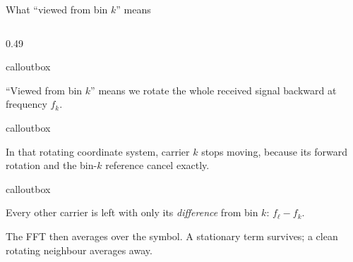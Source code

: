 \documentclass[aspectratio=169,10pt]{beamer}
\newenvironment{callout}{%
  \begin{beamercolorbox}[wd=\linewidth,sep=4pt,rounded=true]{calloutbox}\scriptsize%
}{%
  \end{beamercolorbox}%
}
\begin{document}
\begin{frame}{What ``viewed from bin $k$'' means}
\begin{columns}[T,onlytextwidth]
    \begin{column}{0.49\textwidth}
      \vspace{-0.05cm}
      \begin{callout}
        ``Viewed from bin $k$'' means we rotate the whole received signal backward at frequency $f_k$.
      \end{callout}
      \vspace{0.10cm}
      \begin{callout}
        In that rotating coordinate system, carrier $k$ stops moving, because its forward rotation and the bin-$k$ reference cancel exactly.
      \end{callout}
      \vspace{0.10cm}
      \begin{callout}
        Every other carrier is left with only its \emph{difference} from bin $k$: $f_\ell-f_k$.
      \end{callout}
      \vspace{0.14cm}
      {\scriptsize\color{muted}
      The FFT then averages over the symbol. A stationary term survives; a clean rotating neighbour averages away.}
    \end{column}
  \end{columns}
\end{frame}
\end{document}
